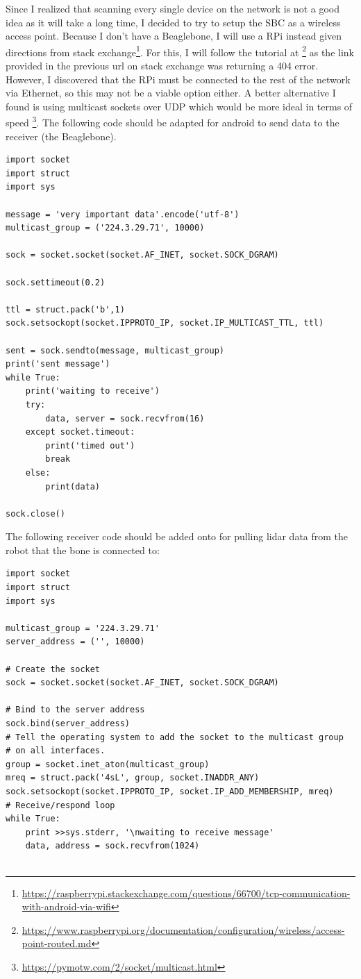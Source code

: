 \documentclass[fontsize=11pt, %
                             paper=a4, %
                             twoside, %
                             captions=tableheading,
                             index=totoc,
                             hyperref]{labbook}
\begin{document}
\begin{addmargin}[0cm]{0cm}
Since I realized that scanning every single device on the network is not a good idea as it will take a long time, I decided to try to setup the SBC as a wireless access point. Because I don't have a Beaglebone, I will use a RPi instead given directions from stack exchange\footnote{\url{https://raspberrypi.stackexchange.com/questions/66700/tcp-communication-with-android-via-wifi}}. For this, I will follow the tutorial at \footnote{\url{https://www.raspberrypi.org/documentation/configuration/wireless/access-point-routed.md}} as the link provided in the previous url on stack exchange was returning a 404 error. However, I discovered that the RPi must be connected to the rest of the network via Ethernet, so this may not be a viable option either. A better alternative I found is using multicast sockets over UDP which would be more ideal in terms of speed \footnote{\url{https://pymotw.com/2/socket/multicast.html}}. The following code should be adapted for android to send data to the receiver (the Beaglebone).
\begin{Verbatim}
import socket
import struct
import sys

message = 'very important data'.encode('utf-8')
multicast_group = ('224.3.29.71', 10000)

sock = socket.socket(socket.AF_INET, socket.SOCK_DGRAM)

sock.settimeout(0.2)

ttl = struct.pack('b',1)
sock.setsockopt(socket.IPPROTO_IP, socket.IP_MULTICAST_TTL, ttl)

sent = sock.sendto(message, multicast_group)
print('sent message')
while True:
    print('waiting to receive')
    try:
        data, server = sock.recvfrom(16)
    except socket.timeout:
        print('timed out')
        break
    else:
        print(data)

sock.close()
\end{Verbatim}
The following receiver code should be added onto for pulling lidar data from the robot that the bone is connected to:
\begin{Verbatim}
import socket
import struct
import sys

multicast_group = '224.3.29.71'
server_address = ('', 10000)

# Create the socket
sock = socket.socket(socket.AF_INET, socket.SOCK_DGRAM)

# Bind to the server address
sock.bind(server_address)
# Tell the operating system to add the socket to the multicast group
# on all interfaces.
group = socket.inet_aton(multicast_group)
mreq = struct.pack('4sL', group, socket.INADDR_ANY)
sock.setsockopt(socket.IPPROTO_IP, socket.IP_ADD_MEMBERSHIP, mreq)
# Receive/respond loop
while True:
    print >>sys.stderr, '\nwaiting to receive message'
    data, address = sock.recvfrom(1024)
    

\end{Verbatim}
\end{addmargin}
\end{document}

